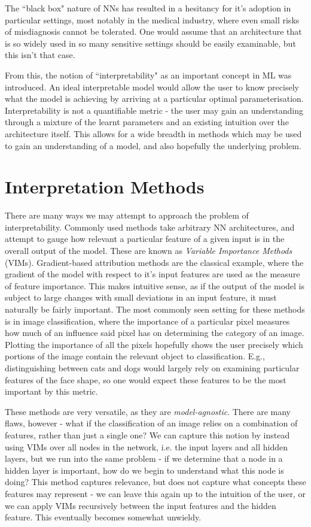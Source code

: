 \documentclass[conference]{report}
\begin{document}
The ``black box" nature of NNs has resulted in a hesitancy for it's adoption in particular settings, most notably in the medical industry, where even small risks of misdiagnosis cannot be tolerated. One would assume that an architecture that is so widely used in so many sensitive settings should be easily examinable, but this isn't that case.

From this, the notion of ``interpretability" as an important concept in ML was introduced. An ideal interpretable model would allow the user to know precisely what the model is achieving by arriving at a particular optimal parameterisation. Interpretability is not a quantifiable metric - the user may gain an understanding through a mixture of the learnt parameters and an existing intuition over the architecture itself. This allows for a wide breadth in methods which may be used to gain an understanding of a model, and also hopefully the underlying problem.

\section{Interpretation Methods}

There are many ways we may attempt to approach the problem of interpretability. Commonly used methods take arbitrary NN architectures, and attempt to gauge how relevant a particular feature of a given input is in the overall output of the model. These are known as \textit{Variable Importance Methods} (VIMs). Gradient-based attribution methods \cite{gradientattribute} are the classical example, where the gradient of the model with respect to it's input features are used as the measure of feature importance. This makes intuitive sense, as if the output of the model is subject to large changes with small deviations in an input feature, it must naturally be fairly important. The most commonly seen setting for these methods is in image classification, where the importance of a particular pixel measures how much of an influence said pixel has on determining the category of an image. Plotting the importance of all the pixels hopefully shows the user precisely which portions of the image contain the relevant object to classification. E.g., distinguishing between cats and dogs would largely rely on examining particular features of the face shape, so one would expect these features to be the most important by this metric.

These methods are very versatile, as they are \textit{model-agnostic}. There are many flaws, however - what if the classification of an image relies on a combination of features, rather than just a single one? We can capture this notion by instead using VIMs over all nodes in the network, i.e. the input layers and all hidden layers, but we run into the same problem - if we determine that a node in a hidden layer is important, how do we begin to understand what this node is doing? This method captures relevance, but does not capture what concepts these features may represent - we can leave this again up to the intuition of the user, or we can apply VIMs recursively between the input features and the hidden feature. This eventually becomes somewhat unwieldy. 
\end{document}
